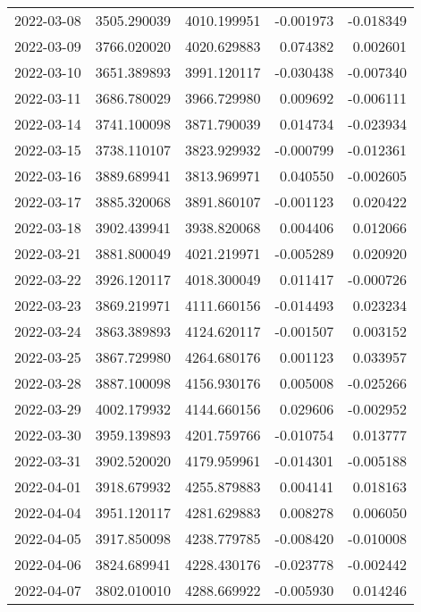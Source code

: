 \begin{tabular}{lrrrr}
2022-03-08 & 3505.290039 & 4010.199951 &       -0.001973 &    -0.018349 \\
2022-03-09 & 3766.020020 & 4020.629883 &        0.074382 &     0.002601 \\
2022-03-10 & 3651.389893 & 3991.120117 &       -0.030438 &    -0.007340 \\
2022-03-11 & 3686.780029 & 3966.729980 &        0.009692 &    -0.006111 \\
2022-03-14 & 3741.100098 & 3871.790039 &        0.014734 &    -0.023934 \\
2022-03-15 & 3738.110107 & 3823.929932 &       -0.000799 &    -0.012361 \\
2022-03-16 & 3889.689941 & 3813.969971 &        0.040550 &    -0.002605 \\
2022-03-17 & 3885.320068 & 3891.860107 &       -0.001123 &     0.020422 \\
2022-03-18 & 3902.439941 & 3938.820068 &        0.004406 &     0.012066 \\
2022-03-21 & 3881.800049 & 4021.219971 &       -0.005289 &     0.020920 \\
2022-03-22 & 3926.120117 & 4018.300049 &        0.011417 &    -0.000726 \\
2022-03-23 & 3869.219971 & 4111.660156 &       -0.014493 &     0.023234 \\
2022-03-24 & 3863.389893 & 4124.620117 &       -0.001507 &     0.003152 \\
2022-03-25 & 3867.729980 & 4264.680176 &        0.001123 &     0.033957 \\
2022-03-28 & 3887.100098 & 4156.930176 &        0.005008 &    -0.025266 \\
2022-03-29 & 4002.179932 & 4144.660156 &        0.029606 &    -0.002952 \\
2022-03-30 & 3959.139893 & 4201.759766 &       -0.010754 &     0.013777 \\
2022-03-31 & 3902.520020 & 4179.959961 &       -0.014301 &    -0.005188 \\
2022-04-01 & 3918.679932 & 4255.879883 &        0.004141 &     0.018163 \\
2022-04-04 & 3951.120117 & 4281.629883 &        0.008278 &     0.006050 \\
2022-04-05 & 3917.850098 & 4238.779785 &       -0.008420 &    -0.010008 \\
2022-04-06 & 3824.689941 & 4228.430176 &       -0.023778 &    -0.002442 \\
2022-04-07 & 3802.010010 & 4288.669922 &       -0.005930 &     0.014246 \\

\end{tabular}
